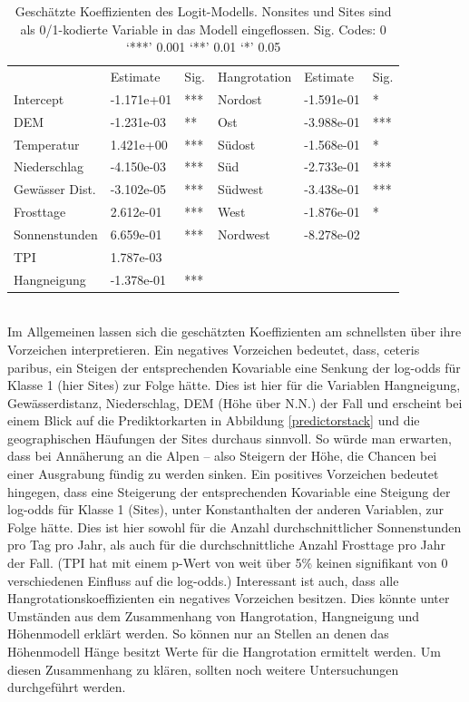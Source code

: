 \begin{table}[htb]
\centering
\begin{tabular}{llllll}
\hline
               & Estimate   & Sig. & Hangrotation & Estimate   & Sig.\\
Intercept      & -1.171e+01 & ***       & Nordost      & -1.591e-01 & *         \\
DEM            & -1.231e-03 & **        & Ost          & -3.988e-01 & ***       \\
Temperatur     & 1.421e+00  & ***       & Südost       & -1.568e-01 & *         \\
Niederschlag   & -4.150e-03 & ***       & Süd          & -2.733e-01 & ***       \\
Gewässer Dist. & -3.102e-05 & ***       & Südwest      & -3.438e-01 & ***       \\
Frosttage      & 2.612e-01  & ***       & West         & -1.876e-01 & *         \\
Sonnenstunden  & 6.659e-01  & ***       & Nordwest     & -8.278e-02 &           \\
TPI            & 1.787e-03  &           &              &            &           \\
Hangneigung    & -1.378e-01 & ***       &              &            &           \\
\hline
\end{tabular}
\caption{Geschätzte Koeffizienten des Logit-Modells. Nonsites und Sites sind als 0/1-kodierte Variable in das Modell eingeflossen. Sig. Codes: 0 ‘***’ 0.001 ‘**’ 0.01 ‘*’ 0.05 }
\label{tab:basefitcoeffs}
\end{table} \\
Im Allgemeinen lassen sich die geschätzten Koeffizienten am schnellsten über ihre Vorzeichen interpretieren. Ein negatives Vorzeichen bedeutet, dass, ceteris paribus, ein Steigen der entsprechenden Kovariable eine Senkung der log-odds für Klasse 1 (hier Sites) zur Folge hätte. Dies ist hier für die Variablen Hangneigung, Gewässerdistanz, Niederschlag, DEM (Höhe über N.N.) der Fall und erscheint bei einem Blick auf die Prediktorkarten in Abbildung \ref{predictorstack} und die geographischen Häufungen der Sites durchaus sinnvoll. So würde man erwarten, dass bei Annäherung an die Alpen -- also Steigern der Höhe, die Chancen bei einer Ausgrabung fündig zu werden sinken. Ein positives Vorzeichen bedeutet hingegen, dass eine Steigerung der entsprechenden Kovariable eine Steigung der log-odds für Klasse 1 (Sites), unter Konstanthalten der anderen Variablen, zur Folge hätte. Dies ist hier sowohl für die Anzahl durchschnittlicher Sonnenstunden pro Tag pro Jahr, als auch für die durchschnittliche Anzahl Frosttage pro Jahr der Fall. (TPI hat mit einem p-Wert von weit über 5\% keinen signifikant von 0 verschiedenen Einfluss auf die log-odds.) Interessant ist auch, dass alle Hangrotationskoeffizienten ein negatives Vorzeichen besitzen. Dies könnte unter Umständen aus dem Zusammenhang von Hangrotation, Hangneigung und Höhenmodell erklärt werden. So können nur an Stellen an denen das Höhenmodell Hänge besitzt Werte für die Hangrotation ermittelt werden. Um diesen Zusammenhang zu klären, sollten noch weitere Untersuchungen durchgeführt werden. \\
